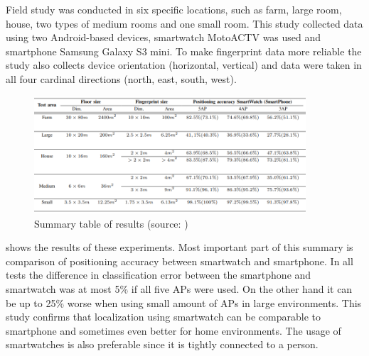 Field study was conducted in six specific locations, such as farm, large room, house, two types of medium rooms and one small room. This study collected data using two Android-based devices, smartwatch MotoACTV was used and smartphone Samsung Galaxy S3 mini. To make fingerprint data more reliable the study also collects device orientation (horizontal, vertical) and data were taken in all four cardinal directions (north, east, south, west).

\begin{figure}[H]
	\begin{centering}
		\includegraphics[width=0.9\textwidth]{img/smartwatch_vs_smartphone}
		\par\end{centering}
	\caption{Summary table of results (source: \cite{SWvsSP})\label{fig:SWvsSP}}
	\label{fig02c03}
\end{figure}

 shows the results of these experiments. Most important part of this summary is comparison of positioning accuracy between smartwatch and smartphone. In all tests the difference in classification error between the smartphone and smartwatch was at most 5\% if all five APs were used. On the other hand it can be up to 25\% worse when using small amount of APs in large environments. This study confirms that localization using smartwatch can  be comparable to smartphone and sometimes even better for home environments. The usage of smartwatches is also preferable since it is tightly connected to a person.
